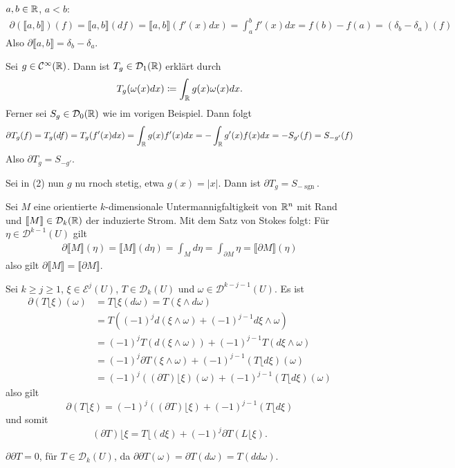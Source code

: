 \documentclass[a4paper,twoside,DIV15,BCOR12mm]{scrbook}
\newcommand{\MR}{\lfloor}
\begin{document}
\begin{beispiele}
\item $a,b\in \mathbb{R}$, $a<b$:
\begin{align*}
\partial(\llbracket a,b\rrbracket) (f) = \llbracket a,b\rrbracket(df) = \llbracket a,b\rrbracket(f'(x)dx) = \int_a^b f'(x) dx = f(b)-f(a) = (\delta_b-\delta_a)(f)
\end{align*}
Also $\partial\llbracket a,b\rrbracket = \delta_b - \delta_a$.

\item Sei $g\in \mathcal C^\infty(\mathbb{R})$. Dann ist $T_g\in \mathcal D_1(\mathbb{R})$ erklärt durch
\begin{align*}
T_g(\omega(x)dx) \da \int_\MdR g(x) \omega(x) dx.
\end{align*}
Ferner sei $S_g\in\mathcal D_0(\mathbb{R})$ wie im vorigen Beispiel. Dann folgt
\begin{align*}
\partial T_g(f) = T_g(df) = T_g(f'(x)dx) = \int_{\mathbb{R}} g(x) f'(x) dx = -\int_{\mathbb{R}} g'(x) f(x) dx = -S_{g'}(f) = S_{-g'}(f)
\end{align*}
Also $\partial T_g = S_{-g'}$.
\item Sei in (2) nun $g$ nu rnoch stetig, etwa $g(x) = |x|$. Dann ist $\partial T_g = S_{-\operatorname{sgn}}$.
\item Sei $M$ eine orientierte $k$-dimensionale Untermannigfaltigkeit von $\mathbb{R}^n$ mit Rand und $\llbracket M \rrbracket\in\mathcal D_k(\mathbb{R})$ der induzierte Strom. Mit dem Satz von Stokes folgt: Für $\eta \in \mathcal D^{k-1}(U)$ gilt
\begin{align*}
\partial\llbracket M \rrbracket (\eta) = \llbracket M \rrbracket (d\eta) = \int_M d \eta = \int_{\partial M} \eta = \llbracket \partial M\rrbracket(\eta)
\end{align*}
also gilt $\partial\llbracket M \rrbracket = \llbracket \partial M\rrbracket$.
\item Sei $k \ge j \ge 1$, $\xi\in\mathcal E^{j}(U)$, $T\in\mathcal D_k(U)$ und $\omega \in \mathcal D^{k-j-1}(U)$. Es ist
\begin{align*}
\partial(T\MR \xi)(\omega)
&= T\MR\xi(d\omega) =  T(\xi\wedge d\omega)\\
&= T( (-1)^j d(\xi\wedge \omega) + (-1)^{j-1} d\xi \wedge\omega)\\
&= (-1)^jT(d(\xi\wedge\omega)) + (-1)^{j-1} T(d\xi \wedge \omega) \\
&= (-1)^j\partial T(\xi\wedge \omega) + (-1)^{j-1} (T\MR d\xi)(\omega) \\
&= (-1)^j( (\partial T) \MR \xi)(\omega) + (-1)^{j-1} (T\MR d\xi)(\omega)
\end{align*}
also gilt
\[
\partial(T\MR \xi) = (-1)^j ( (\partial T) \MR \xi) + (-1)^{j-1} (T\MR d\xi)
\]
und somit
\[
(\partial T) \MR \xi = T\MR (d\xi) + (-1)^j \partial T(L\MR\xi).
\]
\item $\partial\partial T=0$, für $T\in\mathcal D_k(U)$, da $\partial\partial T(\omega) = \partial T(d\omega) = T(dd\omega)$.
\end{beispiele}
\end{document}
